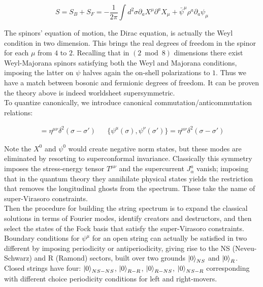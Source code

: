 \begin{equation}
S = S_B + S_F = -\frac{1}{2\pi} \int d^2\sigma \partial_a X^\mu \partial^a X_\mu + \bar \psi^\mu \rho^a \partial_a \psi_\mu
\end{equation}

The spinors' equation of motion, the Dirac equation, is actually the Weyl condition in two dimension. This brings the real degrees of freedom in the spinor for each $\mu$ from $4$ to $2$. Recalling that in $(2\bmod 8)$ dimensions there exist Weyl-Majorana spinors satisfying both the Weyl and Majorana conditions, imposing the latter on $\psi$ halves again the on-shell polarizations to $1$. Thus we have a match between bosonic and fermionic degrees of freedom. It can be proven the theory above is indeed worldsheet supersymmetric.\\

To quantize canonically, we introduce canonical commutation/anticommutation relations:

\begin{align}
[X^\mu(\sigma),X^\nu(\sigma')] = \eta^{\mu\nu} \delta^2(\sigma-\sigma') && \{\psi^\mu(\sigma),\psi^\nu(\sigma')\} = \eta^{\mu\nu} \delta^2(\sigma-\sigma')
\end{align}

Note the $X^0$ and $\psi^0$ would create negative norm states, but these modes are eliminated by resorting to superconformal invariance. Classically this symmetry imposes the stress-energy tensor $T^{\mu\nu}$ and the supercurrent $J^a_\alpha$ vanish; imposing that in the quantum theory they annihilate physical states yields the restriction that removes the longitudinal ghosts from the spectrum. These take the name of super-Virasoro constraints.\\

Then the procedure for building the string spectrum is to expand the classical solutions in terms of Fourier modes, identify creators and destructors, and then select the states of the Fock basis that satisfy the super-Virasoro constraints.\\

Boundary conditions for $\psi^\mu$ for an open string can actually be satisfied in two different by imposing periodicity or antiperiodicity, giving rise to the NS (Neveu-Schwarz) and R (Ramond) sectors, built over two grounds $\ket{0}_{NS}$ and $\ket{0}_R$. Closed strings have four: $\ket{0}_{NS-NS}$, $\ket{0}_{R-R}$, $\ket{0}_{R-NS}$, $\ket{0}_{NS-R}$ corresponding with different choice periodicity conditions for left and right-movers.

